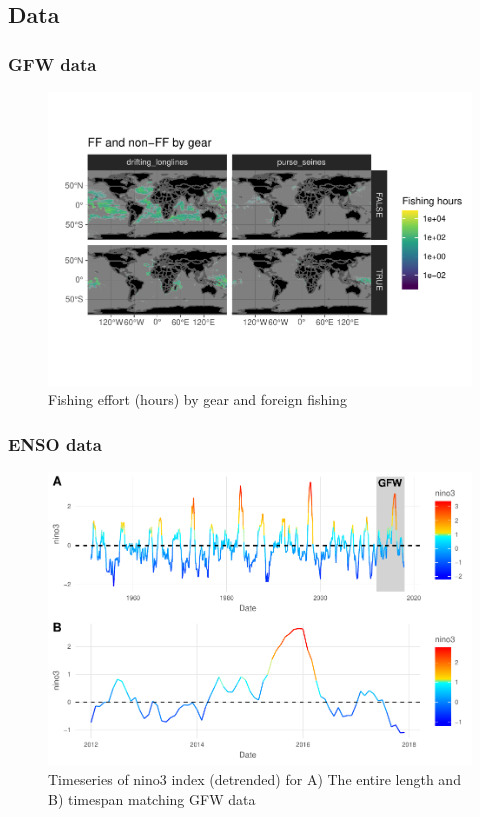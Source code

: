 \documentclass[]{article}
\begin{document}
\subsection{Data}\label{data}

\subsubsection{GFW data}\label{gfw-data}

\begin{figure}
\centering
\includegraphics{Oremus_Villasenor-Derbez_files/figure-latex/unnamed-chunk-3-1.pdf}
\caption{Fishing effort (hours) by gear and foreign fishing}
\end{figure}

\subsubsection{ENSO data}\label{enso-data}

\begin{figure}
\centering
\includegraphics{Oremus_Villasenor-Derbez_files/figure-latex/unnamed-chunk-5-1.pdf}
\caption{Timeseries of nino3 index (detrended) for A) The entire length
and B) timespan matching GFW data}
\end{figure}
\end{document}
